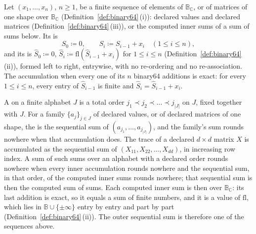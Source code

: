 \begin{definition}\label{def:declared-order}
Let $(x_1,\dots,x_n)$, $n\ge1$, be a finite sequence of elements of
$\mathbb{B}_{\mathbb{C}}$, or of matrices of one shape over
$\mathbb{B}_{\mathbb{C}}$ (Definition~\ref{def:binary64}\,(i)): declared values
and declared matrices (Definition~\ref{def:binary64}\,(iii)), or the computed
inner sums of a sum of sums below. Its
 is
\begin{equation}\label{eq:seqsum}
  S_0\coloneqq0,\qquad S_i\coloneqq S_{i-1}+x_i\quad(1\le i\le n),
\end{equation}
and its  is $\hat S_0\coloneqq0$,
$\hat S_i\coloneqq\mathrm{fl}(\hat S_{i-1}+x_i)$ for $1\le i\le n$
(Definition~\ref{def:binary64}\,(ii)), formed left to right, entrywise, with no
re-ordering and no re-association. The accumulation 
when
every one of its $n$ binary64 additions is exact: for every $1\le i\le n$, every
entry of $\hat S_{i-1}$ is finite and $\hat S_i=\hat S_{i-1}+x_i$.

A  on a finite alphabet $J$ is a total order
$j_1\prec j_2\prec\dots\prec j_{|J|}$ on $J$, fixed together with $J$. For a
family $\{a_j\}_{j\in J}$ of declared values, or of declared matrices of one
shape, the  is the sequential
sum of
$(a_{j_1},\dots,a_{j_{|J|}})$, and the family's sum rounds nowhere when that
accumulation does. The trace of a declared $d\times d$ matrix $X$ is
accumulated as the sequential sum of $(X_{11},X_{22},\dots,X_{dd})$, in
increasing row index. A sum of such sums over an alphabet with a declared order
rounds nowhere when every inner accumulation rounds nowhere and the sequential
sum, in that order, of the computed inner sums rounds nowhere; that sequential
sum is then the computed sum of sums. Each computed inner sum is then over
$\mathbb{B}_{\mathbb{C}}$: its last addition is exact, so it equals a sum of
finite numbers, and it is a value of $\mathrm{fl}$, which lies in
$\mathbb{B}\cup\{\pm\infty\}$ entry by entry and part by part
(Definition~\ref{def:binary64}\,(ii)). The outer sequential sum is therefore
one of the sequences above.
\end{definition}
